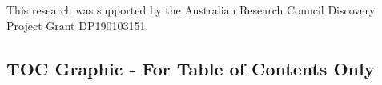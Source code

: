 \documentclass[journal=jpcafh,manuscript=article,layout=onecolumn, 12pt]{achemso}
\begin{document}
\begin{acknowledgement}
	This research was supported by the Australian Research Council Discovery
	Project Grant DP190103151.  
\end{acknowledgement}



\newpage
\onecolumn
\subsection{TOC Graphic - For Table of Contents Only}
\vspace{2ex}
\begin{center}
\end{center}
\end{document}

